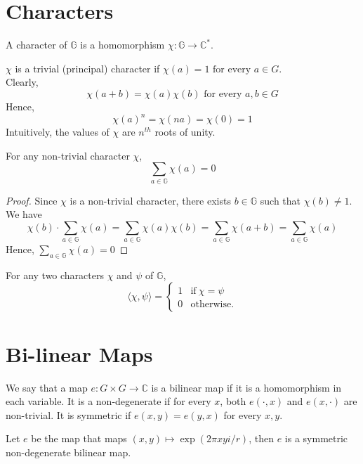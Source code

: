 \section{Characters}
\begin{definition} 
A character of $\mathbb{G}$ is a homomorphism $\chi : \mathbb{G} \rightarrow \mathbb{C}^*$.
\end{definition}
\noindent $\chi$ is a trivial (principal) character if $\chi(a) = 1 \text{ for every } a \in G$. \\
Clearly,
 $$\chi(a+b) = \chi(a) \chi(b) \text{ for every } a,b \in G $$
Hence,
$$\chi(a)^n = \chi(na) = \chi(0) = 1$$
Intuitively, the values of $\chi$ are $n^{th}$ roots of unity.
\begin{prop}
For any non-trivial character $\chi$, 
$$\sum\limits_{a \in \mathbb{G}} \chi(a) = 0$$
\end{prop}
\begin{proof}
Since $\chi$ is a non-trivial character, there exists $b \in \mathbb{G}$ such that $\chi(b) \neq 1$. We have
$$\chi(b) \cdot \sum\limits_{a \in \mathbb{G}} \chi(a)
= \sum\limits_{a \in \mathbb{G}} \chi(a) \chi(b)
= \sum\limits_{a \in \mathbb{G}} \chi(a + b)
= \sum\limits_{a \in \mathbb{G}} \chi(a)$$
Hence, $\sum\limits_{a \in \mathbb{G}} \chi(a) = 0$
\end{proof}

\begin{lemma}
For any two characters $\chi$ and $\psi$ of $\mathbb{G}$, 
$$ \langle \chi, \psi \rangle =
\begin{cases}
	1             & \text{if} \ \chi = \psi \\
	0             & \text{otherwise}.
\end{cases} $$
\end{lemma}

\section{Bi-linear Maps}
\begin{definition}
We say that a map $e : G \times G  \rightarrow \mathbb{C}$ is a bilinear map if it is a homomorphism in each variable. It is a non-degenerate if for every $x$, both $e(\cdot, x)$ and $e(x, \cdot)$ are non-trivial. It is symmetric if $e(x,y) = e(y,x)$ for every $x, y$.
\end{definition}

\begin{lemma}
Let $e$ be the map that maps $(x,y) \mapsto \exp(2\pi xyi/r)$, then $e$ is a symmetric non-degenerate bilinear map.
\end{lemma}

